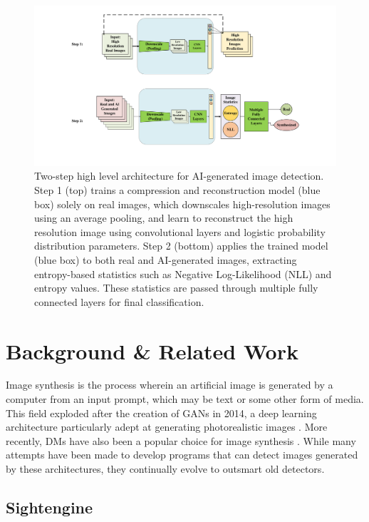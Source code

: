 \documentclass{article} %
\begin{document}
\begin{figure}[htbp]
    \centering
    \includegraphics[width=\linewidth]{Fig/high_level_architecture.pdf}
    \caption{Two-step high level architecture for AI-generated image detection. Step 1 (top) trains a compression and reconstruction model (blue box) solely on real images, which downscales high-resolution images using an average pooling, and learn to reconstruct the high resolution image using convolutional layers and logistic probability distribution parameters. Step 2 (bottom) applies the trained model (blue box) to both real and AI-generated images, extracting entropy-based statistics such as Negative Log-Likelihood (NLL) and entropy values. These statistics are passed through multiple fully connected layers for final classification.}
    \label{fig:high-level-architecture}
\end{figure}

\section{Background \& Related Work}
\label{background}

Image synthesis is the process wherein an artificial image is generated by a computer from an input prompt, which may be text or some other form of media. This field exploded after the creation of GANs in 2014, a deep learning architecture particularly adept at generating photorealistic images \citep{GANfather}. More recently, DMs have also been a popular choice for image synthesis \citep{latent-diffusion}. While many attempts have been made to develop programs that can detect images generated by these architectures, they continually evolve to outsmart old detectors.

\subsection{Sightengine}
\end{document}

